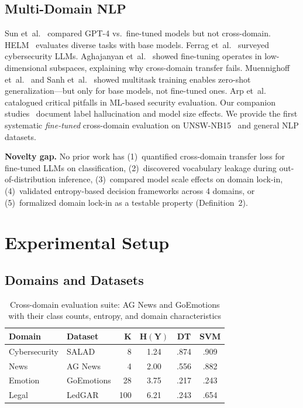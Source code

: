 \documentclass[journal]{IEEEtran}
\begin{document}
\subsection{Multi-Domain NLP}
Sun et~al.~\cite{sun2023} compared GPT-4 vs.\ fine-tuned models but not cross-domain. HELM~\cite{liang2022} evaluates diverse tasks with base models. Ferrag et~al.~\cite{ferrag2024} surveyed cybersecurity LLMs. Aghajanyan et~al.~\cite{aghajanyan2021} showed fine-tuning operates in low-dimensional subspaces, explaining why cross-domain transfer fails. Muennighoff et~al.~\cite{muennighoff2023} and Sanh et~al.~\cite{sanh2022} showed multitask training enables zero-shot generalization---but only for base models, not fine-tuned ones. Arp et~al.~\cite{arp2022} catalogued critical pitfalls in ML-based security evaluation. Our companion studies~\cite{p3,p21} document label hallucination and model size effects. We provide the first systematic \emph{fine-tuned} cross-domain evaluation on UNSW-NB15~\cite{moustafa2016} and general NLP datasets.

\textbf{Novelty gap.} No prior work has (1)~quantified cross-domain transfer loss for fine-tuned LLMs on classification, (2)~discovered vocabulary leakage during out-of-distribution inference, (3)~compared model scale effects on domain lock-in, (4)~validated entropy-based decision frameworks across 4 domains, or (5)~formalized domain lock-in as a testable property (Definition~2).

\section{Experimental Setup}

\subsection{Domains and Datasets}

\begin{table}[!ht]
\centering
\caption{Cross-domain evaluation suite: AG News and GoEmotions with their class counts, entropy, and domain characteristics}
\label{tab:domains}
\begin{tabular}{llrccc}
\toprule
\textbf{Domain} & \textbf{Dataset} & \textbf{K} & $\mathbf{H(Y)}$ & \textbf{DT} & \textbf{SVM} \\
\midrule
Cybersecurity & SALAD & 8 & 1.24 & .874 & .909 \\
News & AG News & 4 & 2.00 & .556 & .882 \\
Emotion & GoEmotions & 28 & 3.75 & .217 & .243 \\
Legal & LedGAR & 100 & 6.21 & .243 & .654 \\
\bottomrule
\end{tabular}
\end{table}
\end{document}
